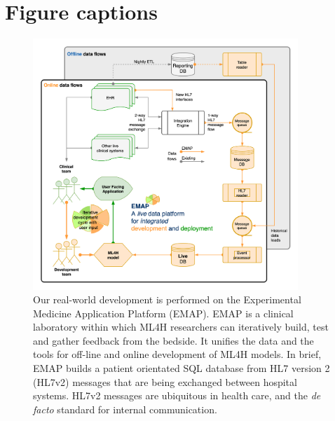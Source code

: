 \documentclass[utf8]{FrontiersinVancouver}
\begin{document}
 



\section*{Figure captions}


\begin{figure}[h!]
\begin{center}
\includegraphics[width=10cm]{assets/emap.png}%
\end{center}
\caption{ 
Our real-world development is performed on the  Experimental Medicine Application Platform (EMAP). EMAP is a clinical laboratory within which ML4H researchers can iteratively build, test and gather feedback from the bedside. It unifies the data and the tools for off-line and online development of ML4H models. In brief, EMAP builds a patient orientated SQL database from HL7 version 2 (HL7v2) messages that are being exchanged between hospital systems. HL7v2 messages are ubiquitous in health care, and the \textit{de facto} standard for internal communication. }\label{fig:1}
\end{figure}
\end{document}
